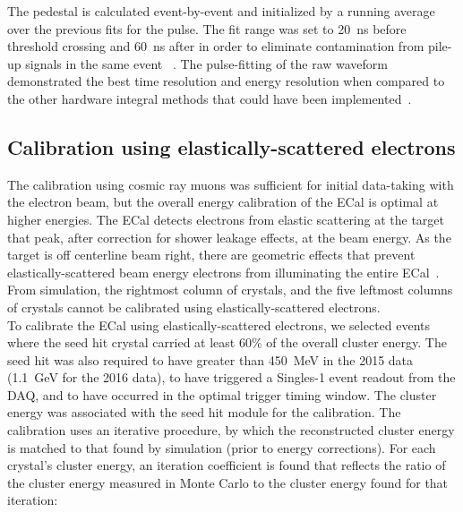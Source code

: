 The pedestal is calculated event-by-event and initialized by a running average over the previous fits for the pulse. The fit range was set to 20~ns before threshold crossing and 60~ns after in order to eliminate contamination from pile-up signals in the same event ~\cite{baltzell_ecal_2015}. The pulse-fitting of the raw waveform demonstrated the best time resolution and energy resolution when compared to the other hardware integral methods that could have been implemented~\cite{baltzell_ecal_2015}.

\subsection{Calibration using elastically-scattered electrons}
The calibration using cosmic ray muons was sufficient for initial data-taking with the electron beam, but the overall energy calibration of the ECal is optimal at higher energies. The ECal detects electrons from elastic scattering at the target that peak, after correction for shower leakage effects, at the beam energy. As the target is off centerline beam right, there are geometric effects that prevent elastically-scattered beam energy electrons from illuminating the entire ECal~\cite{szumila-vance_hps_2016}. From simulation, the rightmost column of crystals, and the five leftmost columns of crystals cannot be calibrated using elastically-scattered electrons. \\
\indent To calibrate the ECal using elastically-scattered electrons, we selected events where the seed hit crystal carried at least 60$\%$ of the overall cluster energy. The seed hit was also required to have greater than 450~MeV in the 2015 data (1.1~GeV for the 2016 data), to have triggered a Singles-1  event readout from the DAQ, and to have occurred in the optimal trigger timing window. The cluster energy was associated with the seed hit module for the calibration. The calibration uses an iterative procedure, by which the reconstructed cluster energy is matched to that found by simulation (prior to energy corrections). For each crystal's cluster energy, an iteration coefficient is found that reflects the ratio of the cluster energy measured in Monte Carlo to the cluster energy found for that iteration:\\

